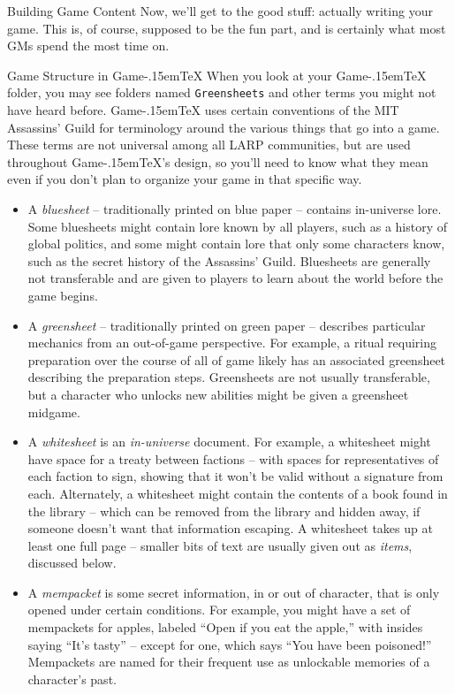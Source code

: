 \documentclass[11pt,  total={6in, 8in}]{article}
\def\gametex{\mbox{Game\kern-.15em\TeX}}
\begin{document}
\begin{section}{Building Game Content}
Now, we'll get to the good stuff: actually writing your game.  This is, of course, supposed to be the fun part, and is certainly what most GMs spend the most time on.

\begin{subsection}{Game Structure in \gametex{}}
When you look at your \gametex{} folder, you may see folders named \texttt{Greensheets} and other terms you might not have heard before.  \gametex{} uses certain conventions of the MIT Assassins' Guild for terminology around the various things that go into a game.  These terms are not universal among all LARP communities, but are used throughout \gametex{}'s design, so you'll need to know what they mean even if you don't plan to organize your game in that specific way.
\begin{itemize}
    \item A \textit{bluesheet} -- traditionally printed on blue paper -- contains in-universe lore.  Some bluesheets might contain lore known by all players, such as a history of global politics, and some might contain lore that only some characters know, such as the secret history of the Assassins' Guild.  Bluesheets are generally not transferable and are given to players to learn about the world before the game begins.
    \item A \textit{greensheet} -- traditionally printed on green paper -- describes particular mechanics from an out-of-game perspective.  For example, a ritual requiring preparation over the course of all of game likely has an associated greensheet describing the preparation steps.  Greensheets are not usually transferable, but a character who unlocks new abilities might be given a greensheet midgame.
    \item A \textit{whitesheet} is an \emph{in-universe} document.  For example, a whitesheet might have space for a treaty between factions -- with spaces for representatives of each faction to sign, showing that it won't be valid without a signature from each.  Alternately, a whitesheet might contain the contents of a book found in the library -- which can be removed from the library and hidden away, if someone doesn't want that information escaping.  A whitesheet takes up at least one full page – smaller bits of text are usually given out as \textit{items}, discussed below.
    \item A \textit{mempacket} is some secret information, in or out of character, that is only opened under certain conditions.  For example, you might have a set of mempackets for apples, labeled ``Open if you eat the apple,'' with insides saying ``It's tasty'' -- except for one, which says ``You have been poisoned!'' Mempackets are named for their frequent use as unlockable memories of a character's past.

\end{itemize}
\end{subsection}
\end{section}
\end{document}
